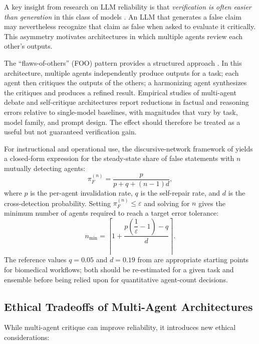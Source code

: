 \documentclass[11pt,letterpaper]{article}
\begin{document}
A key insight from research on LLM reliability is that \emph{verification is often easier than generation} in this class of models \cite{Saunders2022,Madaan2023}. An LLM that generates a false claim may nevertheless recognize that claim as false when asked to evaluate it critically. This asymmetry motivates architectures in which multiple agents review each other's outputs.

The ``flaws-of-others'' (FOO) pattern provides a structured approach \cite{gutierrez2025}. In this architecture, multiple agents independently produce outputs for a task; each agent then critiques the outputs of the others; a harmonizing agent synthesizes the critiques and produces a refined result. Empirical studies of multi-agent debate and self-critique architectures \cite{DuMultiagent2023,Liang2023Divergent} report reductions in factual and reasoning errors relative to single-model baselines, with magnitudes that vary by task, model family, and prompt design. The effect should therefore be treated as a useful but not guaranteed verification gain.

For instructional and operational use, the discursive-network framework of \cite{gutierrez2025} yields a closed-form expression for the steady-state share of false statements with $n$ mutually detecting agents:
\begin{equation}
    \pi_F^{(n)} = \frac{p}{p + q + (n-1)d},
    \label{eq:steadystate}
\end{equation}
where $p$ is the per-agent invalidation rate, $q$ is the self-repair rate, and $d$ is the cross-detection probability. Setting $\pi_F^{(n)} \leq \varepsilon$ and solving for $n$ gives the minimum number of agents required to reach a target error tolerance:
\begin{equation}
    n_{\min} = \left\lceil 1 + \frac{p\!\left(\dfrac{1}{\varepsilon} - 1\right) - q}{d} \right\rceil.
    \label{eq:nmin}
\end{equation}
The reference values $q = 0.05$ and $d = 0.19$ from \cite{gutierrez2025} are appropriate starting points for biomedical workflows; both should be re-estimated for a given task and ensemble before being relied upon for quantitative agent-count decisions.

\subsection{Ethical Tradeoffs of Multi-Agent Architectures}

While multi-agent critique can improve reliability, it introduces new ethical considerations:
\end{document}
